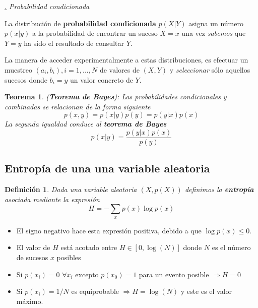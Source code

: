 \documentclass[a4paper,11pt]{book} %
\newtheorem{teorema_contador}{Teorema}
\newcommand{\Teorema}[1]{
		\begin{mybox_gray2}{}
			\begin{teorema_contador}
				 #1 
			\end{teorema_contador} 
		\end{mybox_gray2}
	}
\newtheorem{definicion_contador}{Definición}
\newcommand{\Definicion}[1]{
		\begin{mybox_gray2}{}
			\begin{definicion_contador}
				 #1 
			\end{definicion_contador} 
		\end{mybox_gray2}
	}
\numberwithin{equation}{chapter}
\def\subsubiContadorIt{\par\addtocounter{subsubsection}{1}\underline{\it\thesubsubsection.}\hskip0.5cm \setcounter{subsubsubsectionIt}{0}}
\newcommand{\SubsubiIt}[1]{
		\subsubiContadorIt \textit{#1}
	}
\newcounter{subsubsubsectionIt}[subsubsection]
\begin{document}
			\SubsubiIt{Probabilidad condicionada}

\begin{mybox_gray2}{}
La distribución de \textbf{probabilidad condicionada} $p(X|Y)$ asigna un número $p(x|y)$ a la probabilidad  de encontrar un suceso $X=x$ una vez \textit{sabemos} que $Y=y$ ha sido el resultado de consultar $Y$. 
\end{mybox_gray2}

La manera de acceder experimentalmente a estas distribuciones, es efectuar un muestreo $(a_i,b_i), i=1,...,N$ de valores de $(X,Y)$ y \textit{seleccionar} sólo aquellos sucesos donde $b_i = y$ un valor concreto de $Y$.

\Teorema{ (\textbf{Teorema de Bayes}): Las probabilidades condicionales y combinadas se relacionan de la forma siguiente
	\begin{equation}
	p(x,y) = p(x|y)p(y) = p(y|x) p(x)
	\end{equation}
La segunda igualdad conduce al \textbf{teorema de Bayes}
	\begin{equation}
	p(x|y) = \frac{p(y|x)p(x)}{p(y)}
	\end{equation}
}

		\subsection{Entropía de una una variable aleatoria}

	\Definicion{
	Dada una variable aleatoria $(X,p(X))$ definimos la \textbf{entropía} asociada mediante la expresión
     	\begin{equation}
     	H = -\sum_x p(x)\log p(x)
     	\end{equation}
	}

\begin{itemize}
	\item El signo negativo hace esta expresión positiva, debido a que $\log p(x)\leq 0$.
	
	\item El valor de $H$ está acotado entre $H\in [0,\log(N)]$ donde $N$ es el número de sucesos $x$ posibles
	
	\item Si $p(x_i)=0 \,\,  \forall x_i$ excepto $p(x_0)=1$ para un evento posible $\Rightarrow H=0$
	
	\item Si $p(x_i) = 1/N$ es equiprobable $\Rightarrow H = \log(N)$ y este es el valor máximo. 
	
\end{itemize}
\end{document}
